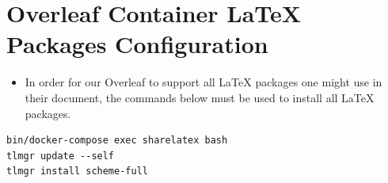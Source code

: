 
\section{Overleaf Container LaTeX Packages Configuration}
\begin{itemize}
    \item In order for our Overleaf to support all LaTeX packages one might use in their document, the commands below must be used to install all LaTeX packages.
\end{itemize}
\begin{verbatim}
bin/docker-compose exec sharelatex bash
tlmgr update --self 
tlmgr install scheme-full
\end{verbatim}
   





